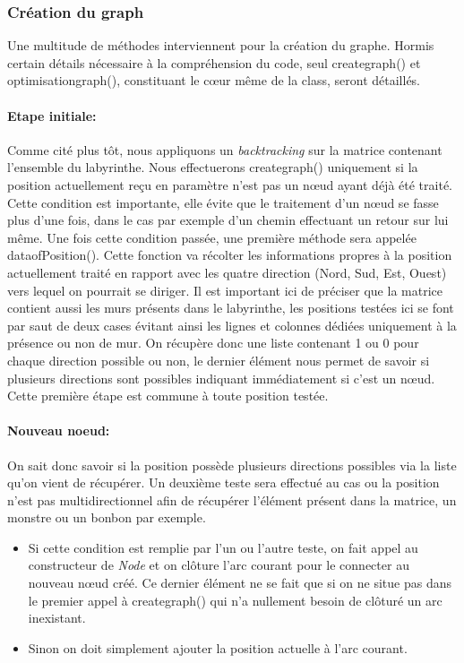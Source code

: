 \documentclass[12pt, oneside]{article}
\begin{document}
\subsubsection{Création du graph}
Une multitude de méthodes interviennent pour la création du graphe. Hormis certain détails nécessaire à la compréhension  du code, seul create\textunderscore graph() et optimisation\textunderscore graph(), constituant le cœur même de la class, seront détaillés.
\paragraph{Etape initiale:}
Comme cité plus tôt, nous appliquons un \emph{backtracking} sur la matrice contenant l’ensemble du labyrinthe. Nous effectuerons create\textunderscore graph() uniquement si la position actuellement reçu en paramètre n’est pas un nœud ayant déjà été traité. Cette condition est importante, elle évite que le traitement d’un nœud se fasse plus d’une fois, dans le cas par exemple d’un chemin effectuant un retour sur lui même.
Une fois cette condition passée, une première méthode sera appelée data\textunderscore ofPosition(). Cette fonction va récolter les informations propres à la position actuellement traité en rapport avec les quatre direction (Nord, Sud, Est, Ouest) vers lequel on pourrait se diriger. Il est important ici de préciser que la matrice contient aussi les murs présents dans le labyrinthe,  les positions testées ici se font par saut de deux cases évitant ainsi les lignes et colonnes dédiées uniquement à la présence ou non de mur.
On récupère donc une liste contenant 1 ou 0 pour chaque direction possible ou non, le dernier élément nous permet de savoir si plusieurs directions sont possibles indiquant immédiatement si c’est un nœud. 
Cette première étape est commune à toute position testée.

\paragraph{Nouveau noeud:}
On sait donc savoir si la position possède plusieurs directions possibles via la liste qu’on vient de récupérer. Un deuxième teste sera effectué au cas ou la position n’est pas multidirectionnel afin de récupérer l’élément présent dans la matrice, un monstre ou un bonbon par exemple.

\begin{itemize}
\item 
Si cette condition est remplie par l’un ou l’autre teste, on fait appel au constructeur de \emph{Node} et on clôture l’arc courant pour le connecter au nouveau nœud créé. Ce dernier élément ne se fait que si on ne situe pas dans le premier appel à create\textunderscore graph() qui n’a nullement besoin de clôturé un arc inexistant.
\item
Sinon on doit simplement ajouter la position actuelle à l’arc courant.
\end{itemize}
\end{document}
